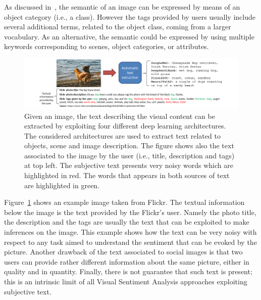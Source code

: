 As discussed in~\cite{gong2014multi}, the semantic of an image can be expressed by means of an object category (i.e., a class). However the tags provided by users usually include several additional terms, related to the object class, coming from a larger vocabulary. As an alternative, the semantic could be expressed by using multiple keywords corresponding to scenes, object categories, or attributes.
\begin{figure}
	\centering
	\includegraphics[width=1\linewidth]{images/pipeline_objective.png}
	\caption{Given an image, the text describing the visual content can be extracted by exploiting four different deep learning architectures. The considered architectures are used to extract text related to objects, scene and image description. The figure shows also the text associated to the image by the user (i.e., title, description and tags) at top left. The subjective text presents very noisy words which are highlighted in red. The words that appears in both sources of text are highlighted in green.}
	\label{figFeaturesExtraction}
\end{figure}

Figure~\ref{figFeaturesExtraction} shows an example image taken from Flickr. The textual information below the image is the text provided by the Flickr's user. Namely the photo title, the description and the tags are usually the text that can be exploited to make inferences on the image.
This example shows how the text can be very noisy with respect to any task aimed to understand the sentiment that can be evoked by the picture. %
Another drawback of the text associated to social images is that two users can provide rather different information about the same picture, either in quality and in quantity. Finally, there is not guarantee that such text is present; this is an intrinsic limit of all Visual Sentiment Analysis approaches exploiting subjective text.

